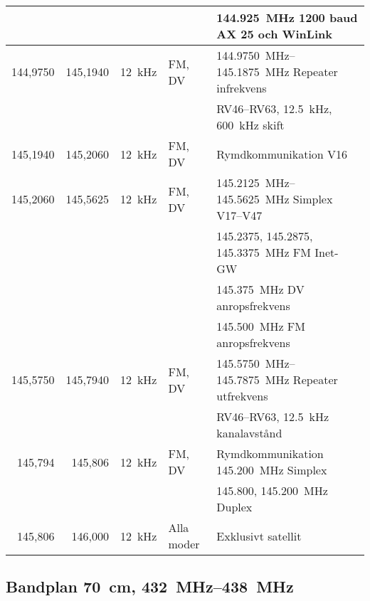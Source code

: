 \begin{tabular}{rrrll}
         &           &         &              & \qty{144,925}{\mega\hertz} \num{1200} baud AX 25 och WinLink \\ \hline
144,9750 & 145,1940  & \qty{12}{\kilo\hertz}  & FM, DV       & \SIrange{144,9750}{145,1875}{\mega\hertz} Repeater infrekvens \\
         &           &         &              & RV46--RV63, \qty{12,5}{\kilo\hertz}, \qty{600}{\kilo\hertz} skift \\ \hline
145,1940 & 145,2060  & \qty{12}{\kilo\hertz}  & FM, DV      & Rymdkommunikation V16                       \\ \hline
145,2060 & 145,5625  & \qty{12}{\kilo\hertz}  & FM, DV       & \SIrange{145,2125}{145,5625}{\mega\hertz} Simplex V17--V47 \\
         &           &         &           & \num{145,2375}, \num{145,2875}, \qty{145,3375}{\mega\hertz} FM Inet-GW \\                       
         &           &         &              & \qty{145,375}{\mega\hertz} DV anropsfrekvens \\
         &           &         &              & \qty{145,500}{\mega\hertz} FM anropsfrekvens   \\ \hline
145,5750 & 145,7940  & \qty{12}{\kilo\hertz}  & FM, DV       & \SIrange{145,5750}{145,7875}{\mega\hertz} Repeater utfrekvens \\
         &           &         &              & RV46--RV63, \qty{12,5}{\kilo\hertz} kanalavstånd                  \\ \hline
145,794  & 145,806   & \qty{12}{\kilo\hertz}  & FM, DV      & Rymdkommunikation \qty{145,200}{\mega\hertz} Simplex  \\            
         &           &         &              & \num{145,800}, \qty{145,200}{\mega\hertz} Duplex \\ \hline
145,806  & 146,000   & \qty{12}{\kilo\hertz}  & Alla moder  & Exklusivt satellit                  \\
\end{tabular}

\subsection{Bandplan \qty{70}{\centi\metre}, \SIrange{432}{438}{\mega\hertz}}
\label{432MHZbandplan}


